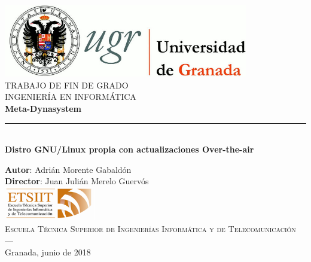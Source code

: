 \begin{titlepage}
	
	\newlength{\centeroffset}
	\setlength{\centeroffset}{-0.5\oddsidemargin}
	\addtolength{\centeroffset}{0.5\evensidemargin}
	\thispagestyle{empty}
	\noindent\hspace*{\centeroffset}
	
	\begin{minipage}{\textwidth}	
		\centering
		\includegraphics[width=0.8\textwidth]{imagenes/logo_ugr.jpg}\\[1.4cm]
		\textsc{\Large TRABAJO DE FIN DE GRADO\\[0.2cm]}
		\textsc{INGENIERÍA EN INFORMÁTICA}\\[1cm]
		{\Huge\bfseries Meta-Dynasystem\\}
		\noindent\rule[-1ex]{\textwidth}{3pt}\\[3.5ex]
		{\large\bfseries Distro GNU/Linux propia con actualizaciones Over-the-air}
	\end{minipage}
	
	\vspace{2.5cm}
	\noindent\hspace*{\centeroffset}\begin{minipage}{\textwidth}
	\centering
	
	\textbf{Autor}: {Adrián Morente Gabaldón}\\[2.5ex]
	\textbf{Director}: {Juan Julián Merelo Guervós}\\[1.5cm]
	\includegraphics[width=0.3\textwidth]{imagenes/etsiit_logo.png}\\[0.1cm]
	\textsc{Escuela Técnica Superior de Ingenierías Informática y de Telecomunicación}\\
	\textsc{---}\\
	Granada, junio de 2018
	\end{minipage}

\end{titlepage}